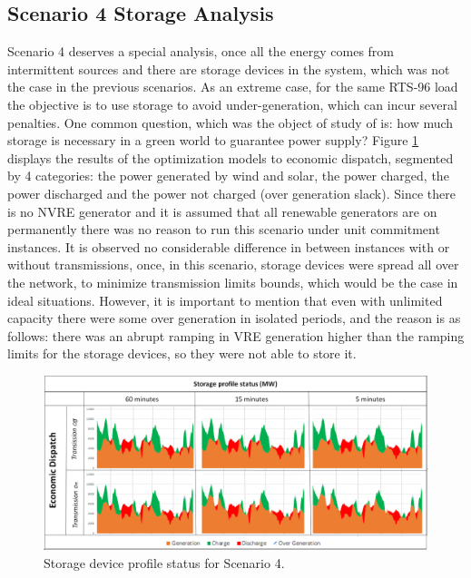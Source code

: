 \documentclass[12pt,LUDisStyle,twosided]{book}
\begin{document}
\subsection{Scenario 4 Storage Analysis}

Scenario 4 deserves a special analysis, once all the energy comes from intermittent sources and there are storage devices in the system, which was not the case in the previous scenarios. As an extreme case, for the same RTS-96 load the objective is to use storage to avoid under-generation, which can incur several penalties. One common question, which was the object of study of \citeauthor{safaei} \cite{safaei} is: how much storage is necessary in a green world to guarantee power supply? Figure \ref{fig:storageprofilestatus} displays the results of the optimization models to economic dispatch, segmented by 4 categories: the power generated by wind and solar, the power charged, the power discharged and the power not charged (over generation slack). Since there is no NVRE generator and it is assumed that all renewable generators are on permanently there was no reason to run this scenario under unit commitment instances. It is observed no considerable difference in between instances with or without transmissions, once, in this scenario, storage devices were spread all over the network, to minimize transmission limits bounds, which would be the case in ideal situations. However, it is important to mention that even with unlimited capacity there were some over generation in isolated periods, and the reason is as follows: there was an abrupt ramping in VRE generation higher than the ramping limits for the storage devices, so they were not able to store it. 

\begin{figure}[H] 
	\begin{center}
		\includegraphics[width=\textwidth,keepaspectratio]{StorageProfileStatusS4.png}
	  	\caption{Storage device profile status for Scenario 4.}
     	\label{fig:storageprofilestatus}
	\end{center}
\end{figure}
\end{document}

